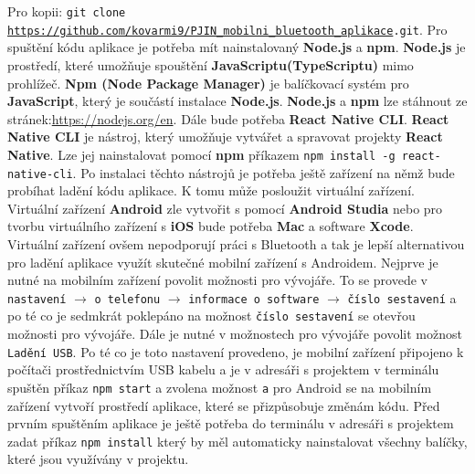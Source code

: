 \hspace{1 cm}
Pro kopii: \texttt{git clone \href{https://github.com/kovarmi9/PJIN\_mobilni\_bluetooth\_aplikace}{https://github.com/kovarmi9/PJIN\_mobilni\_bluetooth\_aplikace}.git}.
Pro spuštění kódu aplikace je potřeba mít nainstalovaný \textbf{Node.js} a \textbf{npm}. \textbf{Node.js} je prostředí, které umožňuje spouštění \textbf{JavaScriptu(TypeScriptu)} mimo prohlížeč. \textbf{Npm (Node Package Manager)} je balíčkovací systém pro \textbf{JavaScript}, který je součástí instalace \textbf{Node.js}. \textbf{Node.js} a \textbf{npm} lze stáhnout ze stránek:\href{https://nodejs.org/en}{https://nodejs.org/en}. Dále bude potřeba \textbf{React Native CLI}. \textbf{React Native CLI} je nástroj, který umožňuje vytvářet a spravovat projekty \textbf{React Native}. Lze jej nainstalovat pomocí \textbf{npm} příkazem \texttt{npm install -g react-native-cli}. 
Po instalaci těchto nástrojů je potřeba ještě zařízení na němž bude probíhat ladění kódu aplikace. K tomu může posloužit virtuální zařízení. Virtuální zařízení \textbf{Android} zle vytvořit s pomocí \textbf{Android Studia} nebo pro tvorbu virtuálního zařízení s \textbf{iOS} bude potřeba \textbf{Mac} a software \textbf{Xcode}. Virtuální zařízení ovšem nepodporují práci s Bluetooth a tak je lepší alternativou pro ladění aplikace využít skutečné mobilní zařízení s Androidem. Nejprve je nutné na mobilním zařízení povolit možnosti pro vývojáře. To se provede v \texttt{nastavení} \(\rightarrow\) \texttt{o telefonu} \(\rightarrow\) \texttt{informace o software} \(\rightarrow\) \texttt{číslo sestavení} a po té co je sedmkrát poklepáno na možnost \texttt{číslo sestavení} se otevřou možnosti pro vývojáře. Dále je nutné v možnostech pro vývojáře povolit možnost \texttt{Ladění USB}. Po té co je toto nastavení provedeno, je mobilní zařízení připojeno k počítači prostřednictvím USB kabelu a je v adresáři s projektem v terminálu spuštěn příkaz \texttt{npm start} a zvolena možnost \texttt{a} pro Android se na mobilním zařízení vytvoří prostředí aplikace, které se přizpůsobuje změnám kódu. Před prvním spuštěním aplikace je ještě potřeba do terminálu v adresáři s projektem zadat příkaz \texttt{npm install} který by měl automaticky nainstalovat všechny balíčky, které jsou využívány v projektu.
